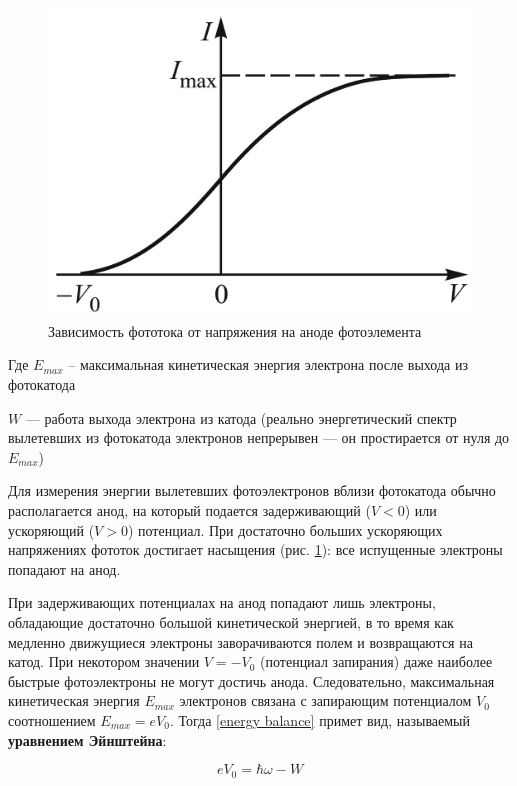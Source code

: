 \documentclass[a4paper,12pt]{article}
\begin{document}
\begin{figure}[h!]
\centering
\includegraphics[scale=0.3]{I(V)}
\caption{Зависимость фототока от напряжения на аноде фотоэлемента}
\label{ris I(V)}
\end{figure}
	
Где $ E_{max} $ --  максимальная кинетическая энергия электрона после выхода из фотокатода

$ W $ --- работа выхода электрона из катода (реально энергетический спектр вылетевших из фотокатода электронов непрерывен --- он простирается от нуля до $ E_{max} $)
	
Для измерения энергии вылетевших фотоэлектронов вблизи фотокатода обычно располагается анод, на который подается задерживающий ($ V < 0 $) или ускоряющий ($ V > 0 $) потенциал. При достаточно больших ускоряющих напряжениях фототок достигает насыщения (рис. \ref{ris I(V)}): все испущенные электроны попадают на анод.
	
При задерживающих потенциалах на анод попадают лишь электроны,
обладающие достаточно большой кинетической энергией, в то время как медленно движущиеся электроны заворачиваются полем и возвращаются на катод. При некотором значении $ V = -V_0 $ (потенциал запирания) даже наиболее быстрые фотоэлектроны не могут достичь анода.
	Следовательно, максимальная кинетическая энергия $ E_{max}$ электронов связана с запирающим потенциалом $ V_0 $ соотношением $ E_{max} = eV_0 $. Тогда \eqref{energy balance} примет вид, называемый \textbf{уравнением Эйнштейна}:
	
\begin{equation}
eV_0 = \hbar\omega - W 
\label{Einsteain}
\end{equation}
	
\end{document}
